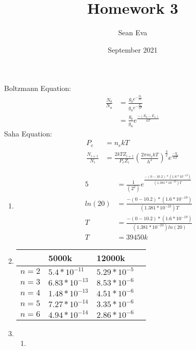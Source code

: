 \documentclass{article}
\title{Homework 3}
\author{Sean Eva}
\date{September 2021}
\begin{document}
\maketitle

Boltzmann Equation:
\begin{align*}
    \frac{N_b}{N_a} &= \frac{g_be^{-\frac{E_b}{kT}}}{g_ae^{-\frac{E_a}{kT}}}\\
    &= \frac{g_b}{g_a}e^{\frac{-(E_b-E_a)}{kT}}
\end{align*}
Saha Equation:
\begin{align*}
    P_e &= n_ekT\\
    \frac{N_{i+1}}{N_i} &= \frac{2kTZ_{i+1}}{P_eZ_i}(\frac{2\pi m_ekT}{h^2})^{\frac{3}{2}}e^{\frac{-\chi_i}{kT}}
\end{align*}

\begin{enumerate}
    \item 
    
    \begin{align*}
        5 &= \frac{1}{(2^2)}e^{\frac{-(0-10.2)*(1.6*10^{-19})}{(1.381*10^{-23})T}}\\
        ln(20) &= \frac{-(0-10.2)*(1.6*10^{-19})}{(1.381*10^{-23})T}\\
        T &= \frac{-(0-10.2)*(1.6*10^{-19})}{(1.381*10^{-23})ln(20)}\\
        T &= 39450k
    \end{align*}
    
    \item
    
    \begin{tabular}{|p{3cm}||p{3cm}|p{3cm}|p{3cm}|}
    \hline
    & 5000k & 12000k\\
    \hline
    $n = 2$ & $5.4*10^{-11}$ &    $5.29*10^{-5}$\\
    $n = 3$ & $6.83*10^{-13}$ & $8.53*10^{-6}$\\
    $n = 4$ & $1.48*10^{-13}$ & $4.51*10^{-6}$\\
    $n = 5$ & $7.27*10^{-14}$ & $3.35*10^{-6}$\\
    $n = 6$ & $4.94*10^{-14}$ & $2.86*10^{-6}$\\
    \hline
    \end{tabular}
    
    \item
    
    \begin{enumerate}
        \item 
        

\end{enumerate}
\end{enumerate}
\end{document}
